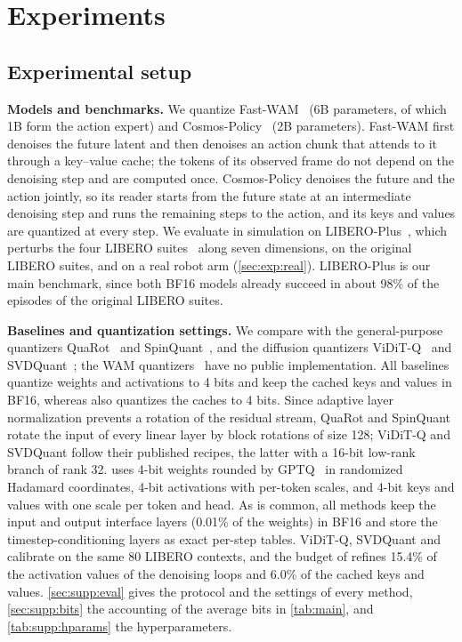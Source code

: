 \section{Experiments}
\label{sec:exp}

\subsection{Experimental setup}
\label{sec:exp:setup}

\noindent\textbf{Models and benchmarks.}
We quantize Fast-WAM~\cite{yuan2026fastwam} (6B parameters, of which 1B form the action expert) and Cosmos-Policy~\cite{kim2026cosmospolicy} (2B parameters).
Fast-WAM first denoises the future latent and then denoises an action chunk that attends to it through a key--value cache; the tokens of its observed frame do not depend on the denoising step and are computed once.
Cosmos-Policy denoises the future and the action jointly, so its reader starts from the future state at an intermediate denoising step and runs the remaining steps to the action, and its keys and values are quantized at every step.
We evaluate in simulation on LIBERO-Plus~\cite{fei2026liberoplus}, which perturbs the four LIBERO suites~\cite{liu2023libero} along seven dimensions, on the original LIBERO suites, and on a real robot arm (\cref{sec:exp:real}).
LIBERO-Plus is our main benchmark, since both BF16 models already succeed in about 98\% of the episodes of the original LIBERO suites.

\noindent\textbf{Baselines and quantization settings.}
We compare with the general-purpose quantizers QuaRot~\cite{ashkboos2024quarot} and SpinQuant~\cite{liu2025spinquant}, and the diffusion quantizers ViDiT-Q~\cite{zhao2025viditq} and SVDQuant~\cite{li2025svdquant}; the WAM quantizers~\cite{zhou2026quantwams,akbari2026qwam,wang2026steerquant} have no public implementation.
All baselines quantize weights and activations to 4 bits and keep the cached keys and values in BF16, whereas \method also quantizes the caches to 4 bits.
Since adaptive layer normalization prevents a rotation of the residual stream, QuaRot and SpinQuant rotate the input of every linear layer by block rotations of size 128; ViDiT-Q and SVDQuant follow their published recipes, the latter with a 16-bit low-rank branch of rank 32.
\method uses 4-bit weights rounded by GPTQ~\cite{frantar2023gptq} in randomized Hadamard coordinates, 4-bit activations with per-token scales, and 4-bit keys and values with one scale per token and head.
As is common, all methods keep the input and output interface layers (0.01\% of the weights) in BF16 and store the timestep-conditioning layers as exact per-step tables.
ViDiT-Q, SVDQuant and \method calibrate on the same 80 LIBERO contexts, and the budget of \method refines 15.4\% of the activation values of the denoising loops and 6.0\% of the cached keys and values.
\cref{sec:supp:eval} gives the protocol and the settings of every method, \cref{sec:supp:bits} the accounting of the average bits in \cref{tab:main}, and \cref{tab:supp:hparams} the hyperparameters.

